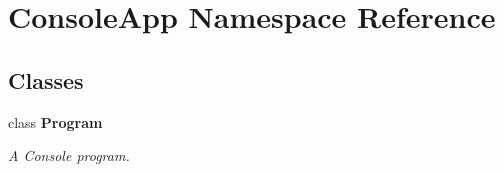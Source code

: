 \hypertarget{namespace_console_app}{}\section{Console\+App Namespace Reference}
\label{namespace_console_app}
\subsection*{Classes}
\begin{DoxyCompactItemize}
\item 
class {\bfseries Program}
\begin{DoxyCompactList}\small\item\em A Console program. \end{DoxyCompactList}\end{DoxyCompactItemize}
